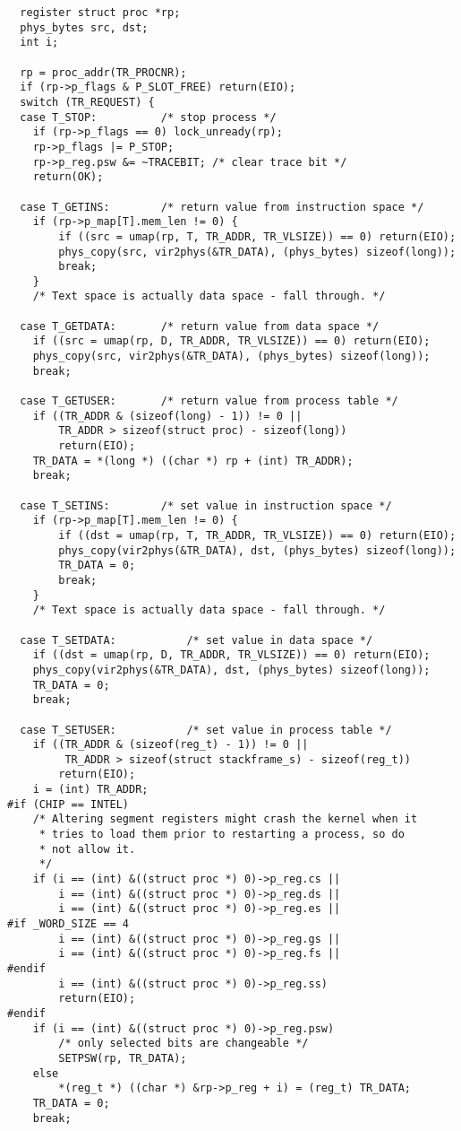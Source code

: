 \begin{verbatim}
  register struct proc *rp;
  phys_bytes src, dst;
  int i;

  rp = proc_addr(TR_PROCNR);
  if (rp->p_flags & P_SLOT_FREE) return(EIO);
  switch (TR_REQUEST) {
  case T_STOP:			/* stop process */
	if (rp->p_flags == 0) lock_unready(rp);
	rp->p_flags |= P_STOP;
	rp->p_reg.psw &= ~TRACEBIT;	/* clear trace bit */
	return(OK);

  case T_GETINS:		/* return value from instruction space */
	if (rp->p_map[T].mem_len != 0) {
		if ((src = umap(rp, T, TR_ADDR, TR_VLSIZE)) == 0) return(EIO);
		phys_copy(src, vir2phys(&TR_DATA), (phys_bytes) sizeof(long));
		break;
	}
	/* Text space is actually data space - fall through. */

  case T_GETDATA:		/* return value from data space */
	if ((src = umap(rp, D, TR_ADDR, TR_VLSIZE)) == 0) return(EIO);
	phys_copy(src, vir2phys(&TR_DATA), (phys_bytes) sizeof(long));
	break;

  case T_GETUSER:		/* return value from process table */
	if ((TR_ADDR & (sizeof(long) - 1)) != 0 ||
	    TR_ADDR > sizeof(struct proc) - sizeof(long))
		return(EIO);
	TR_DATA = *(long *) ((char *) rp + (int) TR_ADDR);
	break;

  case T_SETINS:		/* set value in instruction space */
	if (rp->p_map[T].mem_len != 0) {
		if ((dst = umap(rp, T, TR_ADDR, TR_VLSIZE)) == 0) return(EIO);
		phys_copy(vir2phys(&TR_DATA), dst, (phys_bytes) sizeof(long));
		TR_DATA = 0;
		break;
	}
	/* Text space is actually data space - fall through. */

  case T_SETDATA:			/* set value in data space */
	if ((dst = umap(rp, D, TR_ADDR, TR_VLSIZE)) == 0) return(EIO);
	phys_copy(vir2phys(&TR_DATA), dst, (phys_bytes) sizeof(long));
	TR_DATA = 0;
	break;

  case T_SETUSER:			/* set value in process table */
	if ((TR_ADDR & (sizeof(reg_t) - 1)) != 0 ||
	     TR_ADDR > sizeof(struct stackframe_s) - sizeof(reg_t))
		return(EIO);
	i = (int) TR_ADDR;
#if (CHIP == INTEL)
	/* Altering segment registers might crash the kernel when it
	 * tries to load them prior to restarting a process, so do
	 * not allow it.
	 */
	if (i == (int) &((struct proc *) 0)->p_reg.cs ||
	    i == (int) &((struct proc *) 0)->p_reg.ds ||
	    i == (int) &((struct proc *) 0)->p_reg.es ||
#if _WORD_SIZE == 4
	    i == (int) &((struct proc *) 0)->p_reg.gs ||
	    i == (int) &((struct proc *) 0)->p_reg.fs ||
#endif
	    i == (int) &((struct proc *) 0)->p_reg.ss)
		return(EIO);
#endif
	if (i == (int) &((struct proc *) 0)->p_reg.psw)
		/* only selected bits are changeable */
		SETPSW(rp, TR_DATA);
	else
		*(reg_t *) ((char *) &rp->p_reg + i) = (reg_t) TR_DATA;
	TR_DATA = 0;
	break;


\end{verbatim}
